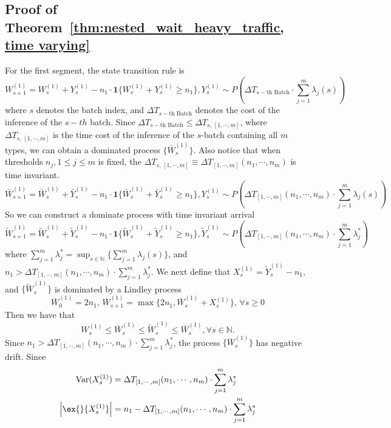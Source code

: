 \subsection{Proof of Theorem~\ref{thm:nested_wait_heavy_traffic, time varying}}\label{appendix:: proof of nested optimality, time varying.}
For the first segment, the state transition rule is 
$$ W^{(1)}_{s+1} = W^{(1)}_{s} + Y^{(1)}_s  - n_1 \cdot \mathbf{1}\{ W^{(1)}_{s} + Y^{(1)}_s  \geq n_1 \},  Y^{(1)}_s \sim P( \Delta T_{ s-\text{th Batch} }\cdot \sum_{j=1}^m \lambda_j(s) )  $$
where $s$ denotes the batch index, and $\Delta T_{s-\text{th Batch}}$ denotes the cost of the inference of the $s-th$ batch. Since $\Delta T_{s-\text{th Batch}}\leq \Delta T_{s, \, [1,\cdots,m]}$, where $\Delta T_{s, \, [1,\cdots,m]}$ is the time cost of the inference of the $s$-batch containing all $m$ types, we can obtain a dominated process $\{\bar{W}^{(1)}_{s}\}$. Also notice that when thresholds $n_j, 1\leq j\leq m$ is fixed, the $\Delta T_{s, \, [1,\cdots,m]} \equiv \Delta T_{ [1,\cdots,m]}(n_1,\cdots,n_m) $ is time invariant.
$$ \bar{W}^{(1)}_{s+1} = \bar{W}^{(1)}_{s} + \bar{Y}^{(1)}_s  - n_1 \cdot \mathbf{1}\{ \bar{W}^{(1)}_{s} + \bar{Y}^{(1)}_s  \geq n_1 \},  Y^{(1)}_s \sim P( \Delta T_{ [1,\cdots,m]}(n_1,\cdots,n_m)\cdot \sum_{j=1}^m \lambda_j(s) )  $$
So we can construct a dominate process with time invariant arrival
$$ \tilde{W}^{(1)}_{s+1} = \tilde{W}^{(1)}_{s} + \tilde{Y}^{(1)}_s  - n_1 \cdot \mathbf{1}\{ \tilde{W}^{(1)}_{s} + \tilde{Y}^{(1)}_s \geq n_1 \},  \tilde{Y}^{(1)}_s \sim P( \Delta T_{ [1,\cdots,m]}(n_1,\cdots,n_m)\cdot \sum_{j=1}^m \lambda_j^* )  $$
where $ \sum_{j=1}^m \lambda_j^*  = \sup_{s \in \mathbb{N}} \{  \sum_{j=1}^m \lambda_j(s)\}  $, and $n_1>  \Delta T_{ [1,\cdots,m]}(n_1,\cdots,n_m)\cdot \sum_{j=1}^m \lambda_j^*$. We next define that $X^{(1)}_s = \tilde{Y}^{(1)}_s - n_1  $, and $\{ \tilde{W}^{(1)}_{s}\}$ is dominated by a Lindley process
$$ \overline{W}^{(1)}_{0} = 2n_1,\,  \overline{W}^{(1)}_{s+1} = \max \{  2n_1, \overline{W}^{(1)}_{s} + X^{(1)}_s \},\,\forall s\geq 0  $$
Then we have that
$$ W^{(1)}_{s}\leq \bar{W}^{(1)}_{s} \leq \tilde{W}^{(1)}_{s} \leq \overline{W}^{(1)}_{s}, \forall s \in \mathbb{N}.$$
Since $n_1>  \Delta T_{ [1,\cdots,m]}(n_1,\cdots,n_m)\cdot \sum_{j=1}^m \lambda_j^*$, the process $\{\overline{W}^{(1)}_{s} \}$ has negative drift. Since 
\begin{align*}
    \text{Var}(X^{(1)}_s ) &= \Delta T_{ [1,\cdots,m]}(n_1,\cdots,n_m)\cdot \sum_{j=1}^m \lambda_j^*\\
    \left|  \ex{}{X^{(1)}_s} \right| &= n_1 - \Delta T_{ [1,\cdots,m]}(n_1,\cdots,n_m)\cdot \sum_{j=1}^m \lambda_j^*
\end{align*}

